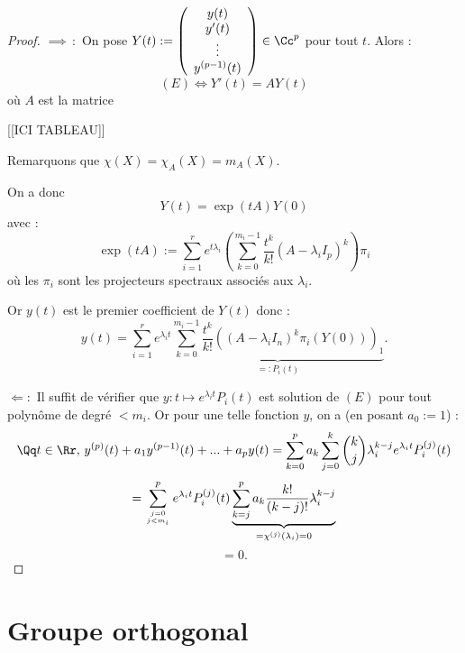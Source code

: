 \documentclass[class=report,crop=false]{standalone}
\begin{document}
\begin{proof}
{\boldmath $\implies \,:$} On pose $Y(t) :=\left(\begin{array}{c}
y(t)\\
y'(t)\\
\vdots\\
y^{(p-1)}(t)
\end{array}
\right) \in \Cc^p$ pour tout $t$. Alors : \[(E) \iff Y'(t) = AY(t)\]
où $A$ est la matrice

[[ICI TABLEAU]]



Remarquons que $\chi(X) = \chi_A(X) = m_A(X)$.

On a donc \[Y(t) = \exp (tA) Y(0) \]
avec :\[\exp(tA) := \sum_{i=1}^r e^{t\lambda_i}\left(\sum_{k=0}^{m_i-1}\frac{t^k}{k!}(A-\lambda_i I_p)^k \right)\pi_i  \]
où les $\pi_i$ sont les projecteurs spectraux associés aux $\lambda_i$.

Or $y(t)$ est le premier coefficient de $Y(t)$ donc :
\[y(t) = \sum_{i=1}^r e^{\lambda_i t } \underbrace{\sum_{k=0}^{m_i-1} \frac{t^k}{k!} \left((A-\lambda_iI_n)^k\pi_i ( Y(0))\right)_1}_{=:P_i(t)} .\]

{\boldmath $ \Leftarrow :$} Il suffit de vérifier que $y: t \mapsto e^{\lambda_i t}P_i(t)$ est solution de $(E)$ pour tout polynôme de degré $< m_i$. Or pour une telle fonction $y$, on a (en posant $a_0:=1$) :
\[\Qq t \in \Rr,\, y^{(p)}(t) +a_1y^{(p-1)}(t)+ ... +a_p y(t) = \sum_{k=0}^p a_k\sum_{j=0}^k { k \choose j} \lambda_i^{k-j}e^{\lambda_i t} P_i^{(j)}(t)\]
\[ = \sum_{j=0 \atop j < m_i }^p e^{\lambda_i t} P_i^{(j)}(t)\underbrace{\sum_{k=j}^p a_k\frac{k!}{(k-j)!} \lambda_i^{k-j}}_{= \chi^{(j)}(\lambda_i) = 0} \]
\[ = 0 .\]
\end{proof}


\chapter{Groupe orthogonal}
\end{document}
